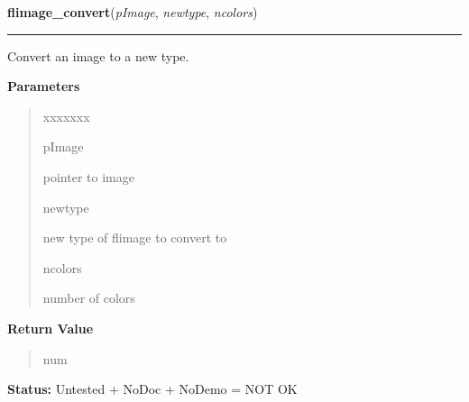 \hspace{.8\funcindent}\begin{boxedminipage}{\funcwidth}

    \raggedright \textbf{flimage\_convert}(\textit{pImage}, \textit{newtype}, \textit{ncolors})

    \vspace{-1.5ex}

    \rule{\textwidth}{0.5\fboxrule}
\setlength{\parskip}{2ex}
    Convert an image to a new type.

\setlength{\parskip}{1ex}
      \textbf{Parameters}
      \vspace{-1ex}

      \begin{quote}
        \begin{Ventry}{xxxxxxx}

          \item[pImage]

          pointer to image

          \item[newtype]

          new type of flimage to convert to

          \item[ncolors]

          number of colors

        \end{Ventry}

      \end{quote}

      \textbf{Return Value}
    \vspace{-1ex}

      \begin{quote}
      num

      \end{quote}

\textbf{Status:} Untested + NoDoc + NoDemo = NOT OK



    \end{boxedminipage}

    \label{xformslib:flflimage:flimage_type_name}

    \vspace{0.5ex}

